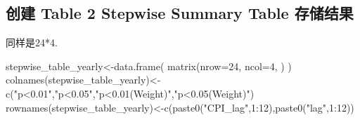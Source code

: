 \documentclass[
]{article}
\newenvironment{Shaded}{\begin{snugshade}}{\end{snugshade}}
\newcommand{\AttributeTok}[1]{\textcolor[rgb]{0.77,0.63,0.00}{#1}}
\newcommand{\DecValTok}[1]{\textcolor[rgb]{0.00,0.00,0.81}{#1}}
\newcommand{\FunctionTok}[1]{\textcolor[rgb]{0.00,0.00,0.00}{#1}}
\newcommand{\NormalTok}[1]{#1}
\newcommand{\OtherTok}[1]{\textcolor[rgb]{0.56,0.35,0.01}{#1}}
\newcommand{\SpecialCharTok}[1]{\textcolor[rgb]{0.00,0.00,0.00}{#1}}
\newcommand{\StringTok}[1]{\textcolor[rgb]{0.31,0.60,0.02}{#1}}
\begin{document}
\hypertarget{ux521bux5efa-table-2-stepwise-summary-table-ux5b58ux50a8ux7ed3ux679c}{%
\subsection{创建 Table 2 Stepwise Summary Table
存储结果}\label{ux521bux5efa-table-2-stepwise-summary-table-ux5b58ux50a8ux7ed3ux679c}}

同样是24*4.

\begin{Shaded}
\begin{Highlighting}[]
\NormalTok{stepwise\_table\_yearly}\OtherTok{\textless{}{-}}\FunctionTok{data.frame}\NormalTok{( }\FunctionTok{matrix}\NormalTok{(}\AttributeTok{nrow=}\DecValTok{24}\NormalTok{, }\AttributeTok{ncol=}\DecValTok{4}\NormalTok{, )   )}
\FunctionTok{colnames}\NormalTok{(stepwise\_table\_yearly)}\OtherTok{\textless{}{-}}\FunctionTok{c}\NormalTok{(}\StringTok{"p\textless{}0.01"}\NormalTok{,}\StringTok{"p\textless{}0.05"}\NormalTok{,}\StringTok{"p\textless{}0.01(Weight)"}\NormalTok{,}\StringTok{"p\textless{}0.05(Weight)"}\NormalTok{)}
\FunctionTok{rownames}\NormalTok{(stepwise\_table\_yearly)}\OtherTok{\textless{}{-}}\FunctionTok{c}\NormalTok{(}\FunctionTok{paste0}\NormalTok{(}\StringTok{"CPI\_lag"}\NormalTok{,}\DecValTok{1}\SpecialCharTok{:}\DecValTok{12}\NormalTok{),}\FunctionTok{paste0}\NormalTok{(}\StringTok{"lag"}\NormalTok{,}\DecValTok{1}\SpecialCharTok{:}\DecValTok{12}\NormalTok{))}
\end{Highlighting}
\end{Shaded}
\end{document}
